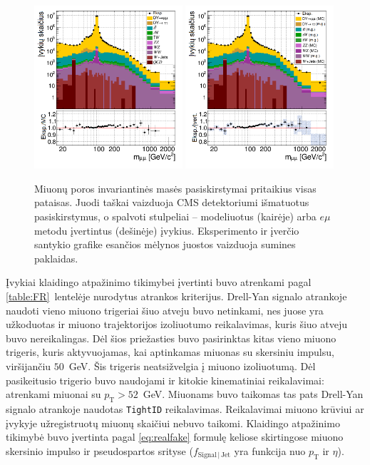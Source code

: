 \documentclass[a4paper, 12pt, oneside]{article}
\newcommand{\ttt}[1]{\texttt{#1}}
\newcommand{\pT}{p_{\mathrm{T}}}
\newcommand{\emu}{e\mu}
\newlength\q
\begin{document}
\begin{figure}[b!]
	\includegraphics[width=0.49\textwidth]{Kursinis3/mumu_mass_after_wQCD.png}
	\includegraphics[width=0.49\textwidth]{Kursinis3/mumu_mass_wEMuEst.png}
	\vspace{-0.5cm}
	\caption{\label{fig:MassMCemu}
		Miuonų poros invariantinės masės pasiskirstymai pritaikius visas pataisas.
		Juodi taškai vaizduoja CMS detektoriumi išmatuotus pasiskirstymus, o spalvoti stulpeliai -- modeliuotus (kairėje)
		arba $\emu$ metodu įvertintus (dešinėje) įvykius.
		Eksperimento ir įverčio santykio grafike esančios mėlynos juostos vaizduoja sumines paklaidas.}
\end{figure}

Įvykiai klaidingo atpažinimo tikimybei įvertinti buvo atrenkami pagal \ref{table:FR}~lentelėje nurodytus atrankos kriterijus.
Drell-Yan signalo atrankoje naudoti vieno miuono trigeriai šiuo atveju buvo netinkami, nes juose yra užkoduotas ir miuono trajektorijos
izoliuotumo reikalavimas, kuris šiuo atveju buvo nereikalingas.
Dėl šios priežasties buvo pasirinktas kitas vieno miuono trigeris, kuris aktyvuojamas, kai aptinkamas miuonas su skersiniu impulsu,
viršijančiu $50$~GeV. Šis trigeris neatsižvelgia į miuono izoliuotumą.
Dėl pasikeitusio trigerio buvo naudojami ir kitokie kinematiniai reikalavimai: atrenkami miuonai su $\pT>52$~GeV.
Miuonams buvo taikomas tas pats Drell-Yan signalo atrankoje naudotas \ttt{TightID} reikalavimas.
Reikalavimai miuono krūviui ar įvykyje užregistruotų miuonų skaičiui nebuvo taikomi.
Klaidingo atpažinimo tikimybė buvo įvertinta pagal \eqref{eq:realfake} formulę keliose skirtingose miuono skersinio impulso ir
pseudospartos srityse ($f_{\mathrm{Signal} \, | \, \mathrm{Jet}}$ yra funkcija nuo $\pT$ ir $\eta$).
\end{document}
